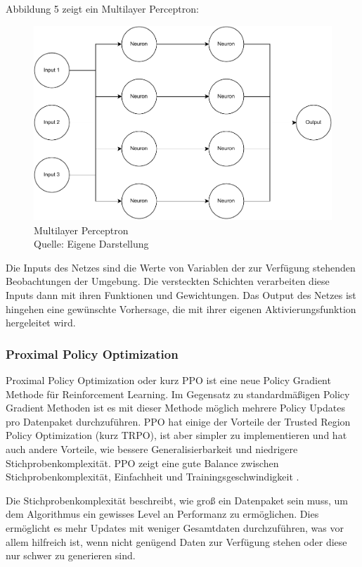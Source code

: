 Abbildung 5 zeigt ein Multilayer Perceptron:
\nopagebreak
\begin{figure}[H]
	\includegraphics[width=1\textwidth]{Bilder/mlp2.drawio} 
	\caption[Multilayer Perceptron]{Multilayer Perceptron\\ Quelle: Eigene Darstellung}
\end{figure}	

Die Inputs des Netzes sind die Werte von Variablen der zur Verfügung stehenden Beobachtungen der Umgebung. Die versteckten Schichten verarbeiten diese Inputs dann mit ihren Funktionen und Gewichtungen. Das Output des Netzes ist hingehen eine gewünschte Vorhersage, die mit ihrer eigenen Aktivierungsfunktion hergeleitet wird.
\subsubsection{Proximal Policy Optimization}
Proximal Policy Optimization oder kurz PPO ist eine neue Policy Gradient Methode für Reinforcement Learning. Im Gegensatz zu standardmäßigen Policy Gradient Methoden ist es mit dieser Methode möglich mehrere Policy Updates pro Datenpaket durchzuführen. PPO hat einige der Vorteile der Trusted Region Policy Optimization (kurz TRPO), ist aber simpler zu implementieren und hat auch andere Vorteile, wie bessere Generalisierbarkeit und niedrigere Stichprobenkomplexität. PPO zeigt eine gute Balance zwischen Stichprobenkomplexität, Einfachheit und Trainingsgeschwindigkeit \cite[Seite 1]{schulman_proximal_2017}.

Die Stichprobenkomplexität beschreibt, wie groß ein Datenpaket sein muss, um dem Algorithmus ein gewisses Level an Performanz zu ermöglichen. Dies ermöglicht es mehr Updates mit weniger Gesamtdaten durchzuführen, was vor allem hilfreich ist, wenn nicht genügend Daten zur Verfügung stehen oder diese nur schwer zu generieren sind.

